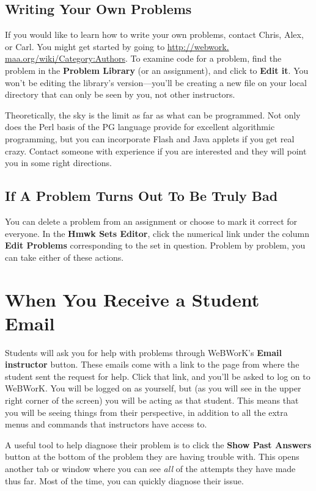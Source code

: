 \documentclass[12pt]{article}
\newcommand{\menu}[1]{\textbf{#1}}
\newcommand{\WW}{WeBWorK}
\newcommand{\HSE}{\menu{Hmwk Sets Editor}}
\begin{document}
\subsection{Writing Your Own Problems}
If you would like to learn how to write your own problems, contact Chris, Alex, or Carl.
You might get started by going to \url{http://webwork.
	maa.org/wiki/Category:Authors}.
To examine code for a problem, find the problem in the \menu{Problem Library} (or an assignment), and click to \menu{Edit it}.
You won't be editing the library's version---you'll be creating a new file on your local directory that can only be seen by you, not other instructors.

Theoretically, the sky is the limit as far as what can be programmed.
Not only does the Perl basis of the PG language provide for excellent algorithmic programming, but you can incorporate Flash and Java applets if you get real crazy.
Contact someone with experience if you are interested and they will point you in some right directions.

\subsection{If A Problem Turns Out To Be Truly Bad}
You can delete a problem from an assignment or choose to mark it correct for everyone.
In the \HSE, click the numerical link under the column \menu{Edit Problems} corresponding to the set in question.
Problem by problem, you can take either of these actions.

\section{When You Receive a Student Email}
Students will ask you for help with problems through \WW's \menu{Email instructor} button.
These emails come with a link to the page from where the student sent the request for help.
Click that link, and you'll be asked to log on to \WW.
You will be logged on as yourself, but (as you will see in the upper right corner of the screen) you will be acting as that student.
This means that you will be seeing things from their perspective, in addition to all the extra menus and commands that instructors have access to.

A useful tool to help diagnose their problem is to click the \menu{Show Past Answers} button at the bottom of the problem they are having trouble with.
This opens another tab or window where you can see \emph{all} of the attempts they have made thus far.
Most of the time, you can quickly diagnose their issue.
\end{document}
